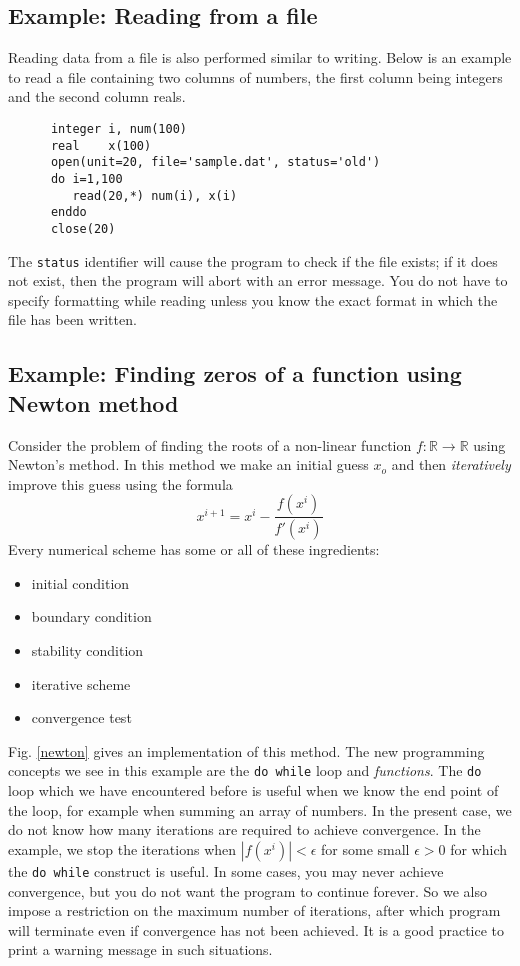 \documentclass[11pt,oneside]{amsart}
\newcommand{\re}{\mathbb{R}}
\begin{document}
\subsection{Example: Reading from a file}

Reading data from a file is also performed similar to writing. Below is an example to read a file containing two columns of numbers, the first column being integers and the second column reals.
\begin{verbatim}
      integer i, num(100)
      real    x(100)
      open(unit=20, file='sample.dat', status='old')
      do i=1,100
         read(20,*) num(i), x(i)
      enddo
      close(20)
\end{verbatim}
The {\tt status} identifier will cause the program to check if the file exists; if it does not exist, then the program will abort with an error message. You do not have to specify formatting while reading unless you know the exact format in which the file has been written.

\subsection{Example: Finding zeros of a function using Newton method}

Consider the problem of finding the roots of a non-linear function $f: \re \to \re$ using Newton's method. In this method we make an initial guess $x_o$ and then {\em iteratively} improve this guess using the formula
\begin{equation}
x^{i+1} = x^i - \frac{ f(x^i) }{ f'(x^i) }
\end{equation}
Every numerical scheme has some or all of these ingredients:
\begin{itemize}
\item initial condition
\item boundary condition
\item stability condition
\item iterative scheme
\item convergence test
\end{itemize}
Fig. \ref{newton} gives an implementation of this method. The new programming concepts we see in this example are the {\tt do while} loop and {\em functions}.  The {\tt do} loop which we have encountered before is useful when we know the end point of the loop, for example when summing an array of numbers. In the present case, we do not know how many iterations are required to achieve convergence. In the example, we stop the iterations when $| f(x^i)| < \epsilon$ for some small $\epsilon > 0$ for which the {\tt do while} construct is useful. In some cases, you may never achieve convergence, but you do not want the program to continue forever. So we also impose a restriction on the maximum number of iterations, after which program will terminate even if convergence has not been achieved. It is a good practice to print a warning message in such situations.
\end{document}
